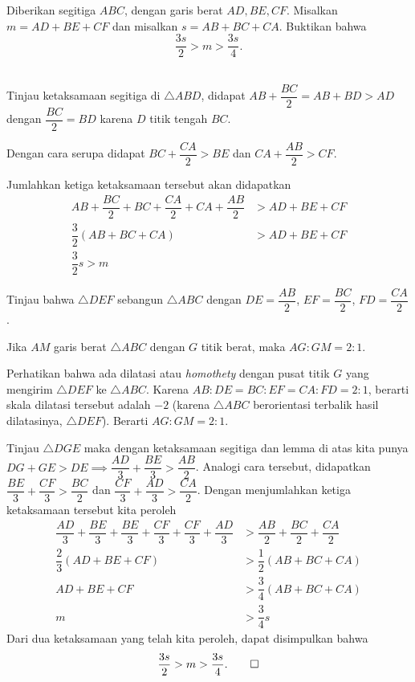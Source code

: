 \documentclass[11pt]{scrartcl}
\begin{document}
	\begin{soalbaru}
		Diberikan segitiga $ABC$, dengan garis berat $AD, BE, CF$. Misalkan $m=AD+BE+CF$ dan misalkan $s=AB+BC+CA$. Buktikan bahwa $$\dfrac{3s}{2} > m > \dfrac{3s}{4}.$$\\[-20pt]
		
		\begin{solusi}
		Tinjau ketaksamaan segitiga di $\triangle ABD$, didapat $AB+\dfrac{BC}{2} = AB+BD > AD$ dengan $\dfrac{BC}{2}=BD$ karena $D$ titik tengah $BC$.
		
		Dengan cara serupa didapat $BC+\dfrac{CA}{2} > BE$ dan $CA + \dfrac{AB}{2}>CF$.
		
		Jumlahkan ketiga ketaksamaan tersebut akan didapatkan 
		\begin{align*}
		AB+\dfrac{BC}{2}+BC+\dfrac{CA}{2}+CA+\dfrac{AB}{2} &> AD+BE+CF\\
		\dfrac{3}{2}\left(AB+BC+CA\right)&> AD+BE+CF\\
		\dfrac{3}{2}s > m
		\end{align*}
		
		Tinjau bahwa $\triangle DEF$ sebangun $\triangle ABC$ dengan $DE = \dfrac{AB}{2}$, $EF=\dfrac{BC}{2}$, $FD=\dfrac{CA}{2}$. 
		
			\begin{lemmarev}
					Jika $AM$ garis berat $\triangle ABC$ dengan $G$ titik berat, maka $AG:GM = 2:1$.
					\begin{buktilemma}
					Perhatikan bahwa ada dilatasi atau \textit{ homothety } dengan pusat titik $G$ yang mengirim $\triangle DEF$ ke $\triangle ABC$. Karena $AB:DE=BC:EF=CA:FD=2:1$, berarti skala dilatasi tersebut adalah $-2$ (karena $\triangle ABC$ berorientasi terbalik hasil dilatasinya, $\triangle DEF$). Berarti $AG:GM=2:1$.
					\end{buktilemma}
				\end{lemmarev}
		
		Tinjau $\triangle DGE$ maka dengan ketaksamaan segitiga dan lemma di atas kita punya $DG + GE > DE \implies \dfrac{AD}{3}+\dfrac{BE}{3}>\dfrac{AB}{2}$. Analogi cara tersebut, didapatkan $\dfrac{BE}{3}+\dfrac{CF}{3}>\dfrac{BC}{2}$ dan $\dfrac{CF}{3}+\dfrac{AD}{3}>\dfrac{CA}{2}$. Dengan menjumlahkan ketiga ketaksamaan tersebut kita peroleh
		\begin{align*}
		\dfrac{AD}{3}+\dfrac{BE}{3}+\dfrac{BE}{3}+\dfrac{CF}{3}+\dfrac{CF}{3}+\dfrac{AD}{3} &> \dfrac{AB}{2}+\dfrac{BC}{2}+\dfrac{CA}{2}\\
		\dfrac{2}{3}\left(AD+BE+CF\right) &> \dfrac{1}{2}\left(AB+BC+CA\right)\\
		AD+BE+CF&> \dfrac{3}{4}\left(AB+BC+CA\right)\\
		m &> \dfrac{3}{4}s
		\end{align*}
		Dari dua ketaksamaan yang telah kita peroleh, dapat disimpulkan bahwa $$\dfrac{3s}{2} > m > \dfrac{3s}{4}.\qed$$ 
		\end{solusi}
	\end{soalbaru}
	
\end{document}
